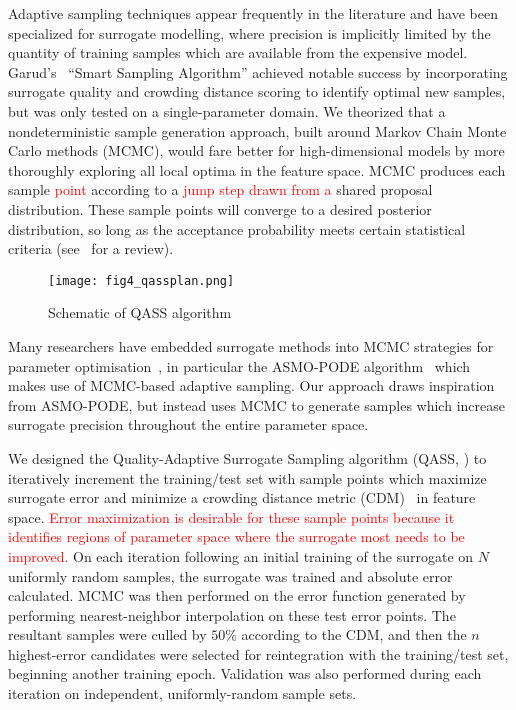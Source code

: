 Adaptive sampling techniques appear frequently in the literature and have been
specialized for surrogate modelling, where precision is implicitly limited by the quantity of training samples which are available from the expensive model. Garud's~\cite{Garud2016} ``Smart Sampling Algorithm'' achieved notable success by incorporating surrogate quality and
crowding distance scoring to identify optimal new samples, but was only tested
on a single-parameter domain. We theorized that a nondeterministic sample
generation approach, built around Markov Chain Monte Carlo methods (MCMC), would
fare better for high-dimensional models by more thoroughly exploring all local
optima in the feature space. MCMC produces each sample \textcolor{red}{point} according to a \textcolor{red}{jump step drawn from a} shared proposal
distribution. These sample points will converge to a desired posterior
distribution, so long as the acceptance probability meets certain statistical criteria (see~\cite{Zhou2018} for a review).

\begin{figure}
	\centering
	\hspace*{-5pt}\texttt{[image: fig4\_qassplan.png]}
	\caption{\label{fig:qassplan}Schematic of QASS algorithm}
\end{figure}

Many researchers have embedded surrogate methods into MCMC strategies for
parameter optimisation~\cite{Zhang2020,Gong2017}, in particular the ASMO-PODE
algorithm~\cite{Ginting2011} which makes use of MCMC-based adaptive sampling. Our approach draws inspiration from ASMO-PODE, but instead uses MCMC to generate samples
which increase surrogate precision throughout the entire parameter space.

We designed the Quality-Adaptive Surrogate Sampling algorithm (QASS, ) to iteratively increment the training/test set with sample
points which maximize surrogate error and minimize a crowding distance metric
(CDM)~\cite{Solonen2012} in feature space. \textcolor{red}{Error maximization is desirable for these sample points because it identifies regions of parameter space where the surrogate most needs to be improved.} On each iteration following an initial training of the surrogate on $N$ uniformly random samples, the surrogate was trained and absolute error calculated. MCMC was then performed on the error function generated by performing nearest-neighbor interpolation on these test error points. The resultant samples were culled by $50\%$ according to the CDM, and then the $n$ highest-error candidates were selected for reintegration with the training/test set, beginning another training epoch. Validation was also performed during each iteration on independent, uniformly-random sample sets.
